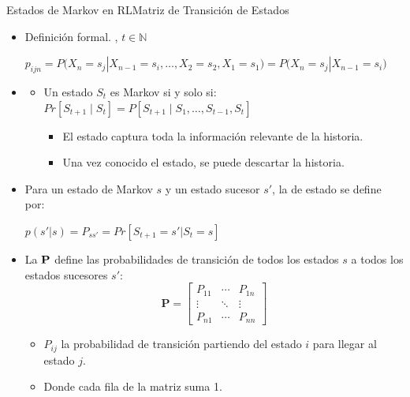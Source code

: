 \documentclass[10pt, envcountsect, handout, aspectratio=1610, hyperref={hypertexnames=true}]{beamer}
\begin{document}
\begin{frame}{Estados de Markov en RL}{Matriz de Transición de Estados}

\begin{itemize}
\item Definición formal. , $t\in \mathbb{N}$    

\hfil $p_{ijn}=P\Big(X_n=s_j | X_{n-1} = s_i, \ldots, X_2=s_2, X_1=s_1\Big) = P\Big(X_n=s_j | X_{n-1} = s_i \Big)$



\item {}

\begin{itemize}
\item Un estado \( S_t \) es Markov si y solo si:
    \(
    Pr[S_{t+1} \mid S_t] = P[S_{t+1} \mid S_1, \dots, S_{t-1}, S_t]
    \)
    \begin{itemize}
        \item El estado captura toda la información relevante de la historia.
        \item Una vez conocido el estado, se puede descartar la historia.
    \end{itemize}
\end{itemize}

\item  Para un estado de Markov $s$ y un estado sucesor $s'$, la de estado se define por:
    \centerline{$p(s'|s) = P_{ss'} = Pr [S_{t+1} = s' | S_t = s]$}

\item La  $\mathbf{P}$ define las probabilidades de transición de todos los estados $s$ a todos los estados sucesores $s'$:
    \begin{equation*}
        \mathbf{P} = \begin{bmatrix}
            P_{11} & \cdots & P_{1n} \\
            \vdots & \ddots & \vdots \\
            P_{n1} & \cdots & P_{nn}
        \end{bmatrix}
    \end{equation*}
    \begin{itemize}
   	\item $P_{ij}$ la probabilidad de transición partiendo del estado $i$ para llegar al estado $j$.
    \item Donde cada fila de la matriz suma 1.
	\end{itemize}

\end{itemize}

\end{frame}
\end{document}
